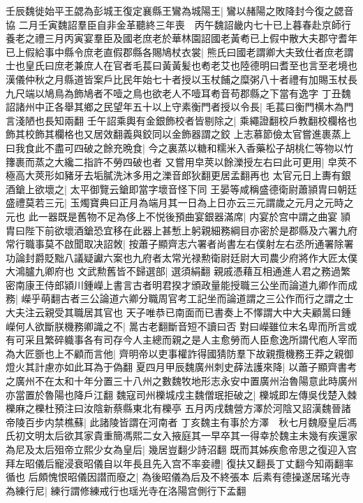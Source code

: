 壬辰魏徙始平王勰為彭城王復定襄縣王鸞為城陽王|{
	鸞以赭陽之敗降封今復之勰音協}
二月壬寅魏詔羣臣自非金革聽終三年喪　丙午魏詔畿内七十已上暮春赴京師行養老之禮三月丙寅宴羣臣及國老庶老於華林園詔國老黃耇已上假中散大夫郡守耆年已上假給事中縣令庶老直假郡縣各賜鳩杖衣裳|{
	熊氏曰國老謂卿大夫致仕者庶老謂士也皇氏曰庶老兼庶人在官者毛萇曰黃黃髪也耇老艾也陸德明曰耆至也言至老境也漢儀仲秋之月縣道皆案戶比民年始七十者授以玉杖餔之糜粥八十者禮有加賜玉杖長九尺端以鳩鳥為飾鳩者不噎之鳥也欲老人不噎耳耇音苟郡縣之下當有逸字}
丁丑魏詔諸州中正各舉其鄉之民望年五十以上守素衡門者授以令長|{
	毛萇曰衡門横木為門言淺陋也長知兩翻}
壬午詔乘輿有金銀飾校者皆剔除之|{
	乘繩證翻校戶教翻校欄格也飾其校飾其欄格也又居效翻義與鉸同以金飾器謂之鉸}
上志慕節儉太官嘗進裹蒸上曰我食此不盡可四破之餘充晩食|{
	今之裏蒸以糖和糯米入香藥松子胡桃仁等物以竹籜裹而蒸之大纔二指許不勞四破也者}
又嘗用皁莢以餘濼授左右曰此可更用|{
	皁莢不極高大莢形如豬牙去垢膩洗沐多用之濼音郎狄翻更居孟翻再也}
太官元日上夀有銀酒鎗上欲壞之|{
	太平御覽云鎗即當字壞音怪下同}
王晏等咸稱盛德衛尉蕭頴胄曰朝廷盛禮莫若三元|{
	玉燭寶典曰正月為端月其一日為上日亦云三元謂歲之元月之元時之元也}
此一器既是舊物不足為侈上不悦後預曲宴銀器滿席|{
	内宴於宫中謂之曲宴}
頴胄曰陛下前欲壞酒鎗恐宜移在此器上甚慙上躬親細務綱目亦密於是郡縣及六署九府常行職事莫不啟聞取决詔敇|{
	按蕭子顯齊志六署者尚書左右僕射左右丞所通署除署功論封爵貶黜八議疑讞六案也九府者太常光禄勲衛尉廷尉大司農少府將作大匠太僕大鴻臚九卿府也}
文武勲舊皆不歸選部|{
	選須絹翻}
親戚憑藉互相通進人君之務過繁密南康王侍郎潁川鍾嶸上書言古者明君揆才頒政量能授職三公坐而論道九卿作而成務|{
	嶸乎萌翻古者三公論道六卿分職周官考工記坐而論道謂之三公作而行之謂之士大夫注云親受其職居其官也}
天子唯恭已南面而已書奏上不懌謂大中大夫顧暠曰鍾嶸何人欲斷朕機務卿識之不|{
	暠古老翻斷音短不讀曰否}
對曰嶸雖位末名卑而所言或有可采且繁碎軄事各有司存今人主總而親之是人主愈勞而人臣愈逸所謂代庖人宰而為大匠斵也上不顧而言他|{
	齊明帝以吏事權詐得國猜防羣下故親攬機務王莽之親御燈火其計慮亦如此耳為于偽翻}
夏四月甲辰魏廣州刺史薛法護來降|{
	以蕭子顯齊書考之廣州不在太和十年分置三十八州之數魏牧地形志永安中置廣州治魯陽意此時廣州亦當置於魯陽也降戶江翻}
魏寇司州櫟城戍主魏僧珉拒破之|{
	櫟城即左傳吳伐楚入棘櫟麻之櫟杜預注曰汝陰新蔡縣東北有櫟亭}
五月丙戌魏營方澤於河陰又詔漢魏晉諸帝陵百步内禁樵蘇|{
	此諸陵皆謂在河南者}
丁亥魏主有事於方澤　秋七月魏廢皇后馮氏初文明太后欲其家貴重簡馮熙二女入掖庭其一早卒其一得幸於魏主未幾有疾還家為尼及太后殂帝立熙少女為皇后|{
	幾居豈翻少詩沼翻}
既而其姊疾愈帝思之復迎入宫拜左昭儀后寵浸衰昭儀自以年長且先入宫不率妾禮|{
	復扶又翻長丁丈翻今知兩翻率循也}
后頗愧恨昭儀因譛而廢之|{
	為後昭儀為后及不終張本}
后素有德操遂居瑤光寺為練行尼|{
	練行謂修練戒行也瑶光寺在洛陽宫側行下孟翻}
